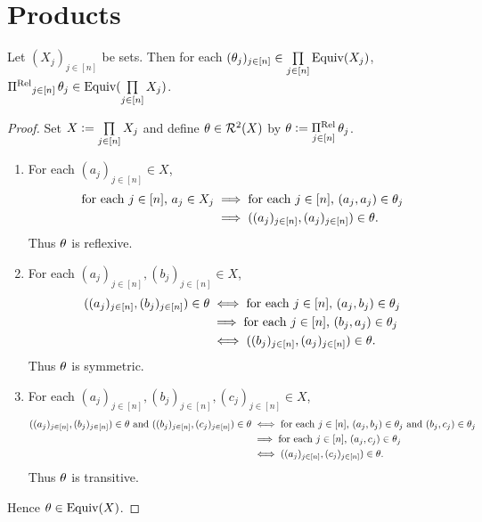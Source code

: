 \newpage
\section{Products}

\begin{ex}
	Let $(X_j)_{j \in [n]}$ be sets. Then for each $(\theta_j)_{j \in [n]} \in \prod\limits_{j \in [n]} \operatorname*{\text{Equiv}}(X_j)$, $\operatorname*{\Pi^{\text{Rel}}}_{j \in [n]} \theta_j \in \operatorname*{\text{Equiv}}(\prod\limits_{j \in [n]} X_j)$.
\end{ex}

\begin{proof}
	Set $X \vcentcolon= \prod\limits_{j \in [n]} X_j$ and define $\theta \in \mathcal{R}^2(X)$ by $\theta \vcentcolon= \operatorname*{\Pi^{\text{Rel}}}\limits_{j \in [n]} \theta_j$.
	\begin{enumerate}
		\item For each $(a_j)_{j \in [n]} \in X$, 
		\begin{align*}
			\text{for each $j \in [n]$, $a_j \in X_j$}
			& \implies \text{for each $j \in [n]$, $(a_j, a_j) \in \theta_j$} \\
			& \implies ((a_j)_{j \in [n]}, (a_j)_{j \in [n]}) \in \theta. 
		\end{align*}
		Thus $\theta$ is reflexive.
		\item For each $(a_j)_{j \in [n]}, (b_j)_{j \in [n]} \in  X $, 
		\begin{align*}
			((a_j)_{j \in [n]}, (b_j)_{j \in [n]}) \in \theta 
			& \iff \text{for each $j \in [n]$, $(a_j, b_j) \in \theta_j$} \\
			& \implies \text{for each $j \in [n]$, $(b_j, a_j) \in \theta_j$} \\
			& \iff ((b_j)_{j \in [n]}, (a_j)_{j \in [n]}) \in \theta.
		\end{align*}
		Thus $\theta$ is symmetric.
		\item For each $(a_j)_{j \in [n]}, (b_j)_{j \in [n]}, (c_j)_{j \in [n]} \in X$, 
		\begin{align*}
			\text{$((a_j)_{j \in [n]}, (b_j)_{j \in [n]}) \in \theta$ and $((b_j)_{j \in [n]}, (c_j)_{j \in [n]}) \in \theta$} 
			& \iff \text{for each $j \in [n]$, $(a_j, b_j) \in \theta_j$ and  $(b_j, c_j) \in \theta_j$} \\
			& \implies \text{for each $j \in [n]$, $(a_j, c_j) \in \theta_j$} \\ 
			& \iff \text{$((a_j)_{j \in [n]}, (c_j)_{j \in [n]}) \in \theta$}.
		\end{align*} 
		Thus $\theta$ is transitive. 
	\end{enumerate}
	Hence $\theta \in \operatorname*{\text{Equiv}}(X)$. 
\end{proof}

